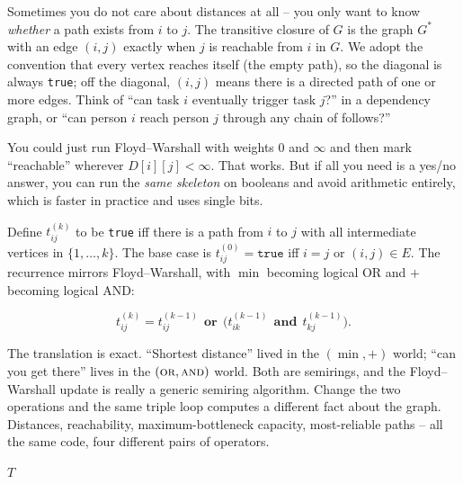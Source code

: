 Sometimes you do not care about distances at all -- you only want to know
\emph{whether} a path exists from $i$ to $j$. The transitive closure of $G$ is
the graph $G^*$ with an edge $(i, j)$ exactly when $j$ is reachable from $i$ in
$G$. We adopt the convention that every vertex reaches itself (the empty path),
so the diagonal is always \texttt{true}; off the diagonal, $(i,j)$ means there
is a directed path of one or more edges. Think of ``can task $i$ eventually
trigger task $j$?'' in a dependency graph, or ``can person $i$ reach person $j$
through any chain of follows?''

You could just run Floyd--Warshall with weights $0$ and $\infty$ and then mark
``reachable'' wherever $D[i][j] < \infty$. That works. But if all you need is a
yes/no answer, you can run the \emph{same skeleton} on booleans and avoid
arithmetic entirely, which is faster in practice and uses single bits.

Define $t^{(k)}_{ij}$ to be \texttt{true} iff there is a path from $i$ to $j$
with all intermediate vertices in $\{1, \dots, k\}$. The base case is
$t^{(0)}_{ij} = \texttt{true}$ iff $i = j$ or $(i,j) \in E$. The recurrence
mirrors Floyd--Warshall, with $\min$ becoming logical OR and $+$ becoming
logical AND:

\[
t^{(k)}_{ij} = t^{(k-1)}_{ij}\ \ \textbf{or}\ \ \big(t^{(k-1)}_{ik}\ \ \textbf{and}\ \ t^{(k-1)}_{kj}\big).
\]

\begin{intuitionbox}
The translation is exact. ``Shortest distance'' lived in the
$(\min, +)$ world; ``can you get there'' lives in the $(\textsc{or},
\textsc{and})$ world. Both are semirings, and the Floyd--Warshall update is
really a generic semiring algorithm. Change the two operations and the same
triple loop computes a different fact about the graph. Distances, reachability,
maximum-bottleneck capacity, most-reliable paths -- all the same code, four
different pairs of operators.
\end{intuitionbox}

\begin{algorithm}[H]
\caption{\textsc{Transitive-Closure}($G$)}
\Return $T$\;
\end{algorithm}

